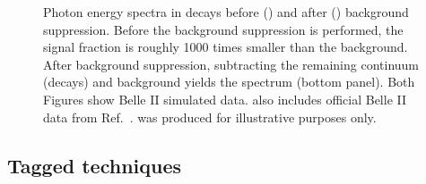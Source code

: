 \begin{figure}[htbp!]
    \centering
    \caption{\label{fig:untagged_btosgamma}
    Photon energy spectra in \BtoXsgamma decays before () and after () background suppression.
    Before the background suppression is performed, the signal fraction is roughly 1000 times smaller than the background.
    After background suppression, subtracting the remaining continuum (\epem\ra\qqbar decays) and \BB background yields the \BtoXsgamma spectrum (bottom panel).
    Both Figures show Belle II simulated data.
     also includes official Belle II data from Ref.~\cite{Collaboration:2302}.
     was produced for illustrative purposes only. 
    }
\end{figure}

\subsection{Tagged techniques}\label{sec:had_tagged_overview}

